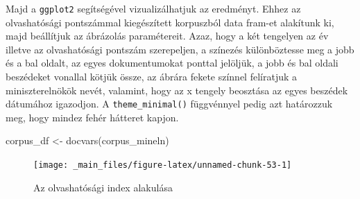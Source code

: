 \documentclass[
]{book}
\newenvironment{Shaded}{\begin{snugshade}}{\end{snugshade}}
\newcommand{\AttributeTok}[1]{\textcolor[rgb]{0.77,0.63,0.00}{#1}}
\newcommand{\DecValTok}[1]{\textcolor[rgb]{0.00,0.00,0.81}{#1}}
\newcommand{\FloatTok}[1]{\textcolor[rgb]{0.00,0.00,0.81}{#1}}
\newcommand{\FunctionTok}[1]{\textcolor[rgb]{0.00,0.00,0.00}{#1}}
\newcommand{\NormalTok}[1]{#1}
\newcommand{\OtherTok}[1]{\textcolor[rgb]{0.56,0.35,0.01}{#1}}
\newcommand{\SpecialCharTok}[1]{\textcolor[rgb]{0.00,0.00,0.00}{#1}}
\newcommand{\StringTok}[1]{\textcolor[rgb]{0.31,0.60,0.02}{#1}}
\begin{document}
Majd a \texttt{ggplot2} segítségével vizualizálhatjuk az eredményt.
Ehhez az olvashatósági pontszámmal kiegészített korpuszból data fram-et
alakítunk ki, majd beállítjuk az ábrázolás paramétereit. Azaz, hogy a
két tengelyen az év illetve az olvashatósági pontszám szerepeljen, a
színezés különböztesse meg a jobb és a bal oldalt, az egyes
dokumentumokat ponttal jelöljük, a jobb és bal oldali beszédeket
vonallal kötjük össze, az ábrára fekete színnel felíratjuk a
miniszterelnökök nevét, valamint, hogy az x tengely beosztása az egyes
beszédek dátumához igazodjon. A \texttt{theme\_minimal()} függvénnyel
pedig azt határozzuk meg, hogy mindez fehér hátteret kapjon.

\begin{Shaded}
\begin{Highlighting}[]
\NormalTok{corpus\_df }\OtherTok{\textless{}{-}} \FunctionTok{docvars}\NormalTok{(corpus\_mineln)}
\end{Highlighting}
\end{Shaded}

\begin{Shaded}
\end{Shaded}

\begin{figure}

{\centering \texttt{[image: \_main\_files/figure-latex/unnamed-chunk-53-1]} 

}

\caption{Az olvashatósági index alakulása}\label{fig:unnamed-chunk-53}
\end{figure}
\end{document}
